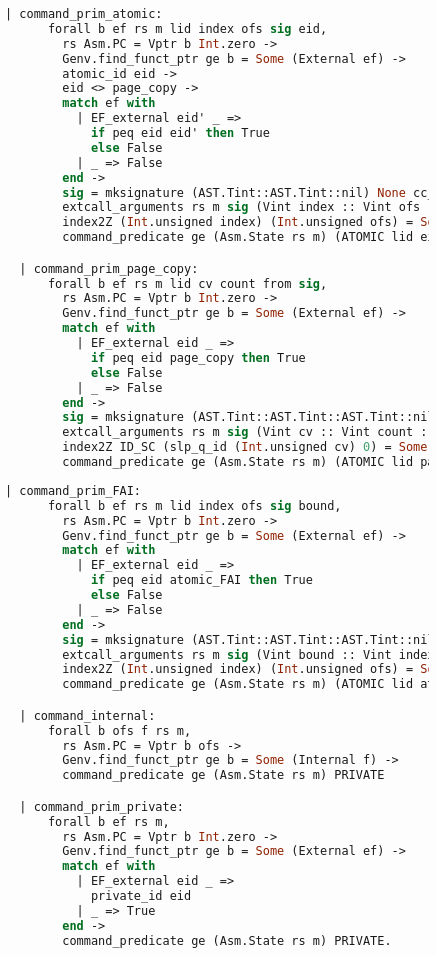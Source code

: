 \begin{figure}
\begin{lstlisting}[language=Caml]
  | command_prim_atomic:
      forall b ef rs m lid index ofs sig eid,
        rs Asm.PC = Vptr b Int.zero ->
        Genv.find_funct_ptr ge b = Some (External ef) ->
        atomic_id eid ->
        eid <> page_copy ->
        match ef with
          | EF_external eid' _ =>
            if peq eid eid' then True
            else False
          | _ => False
        end ->
        sig = mksignature (AST.Tint::AST.Tint::nil) None cc_default ->
        extcall_arguments rs m sig (Vint index :: Vint ofs :: nil) ->
        index2Z (Int.unsigned index) (Int.unsigned ofs) = Some lid ->
        command_predicate ge (Asm.State rs m) (ATOMIC lid eid)

  | command_prim_page_copy:
      forall b ef rs m lid cv count from sig,
        rs Asm.PC = Vptr b Int.zero ->
        Genv.find_funct_ptr ge b = Some (External ef) ->
        match ef with
          | EF_external eid _ => 
            if peq eid page_copy then True
            else False
          | _ => False
        end ->
        sig = mksignature (AST.Tint::AST.Tint::AST.Tint::nil) None cc_default ->
        extcall_arguments rs m sig (Vint cv :: Vint count :: Vint from :: nil) ->
        index2Z ID_SC (slp_q_id (Int.unsigned cv) 0) = Some lid ->
        command_predicate ge (Asm.State rs m) (ATOMIC lid page_copy)
\end{lstlisting}
\end{figure}

\begin{figure}

\begin{lstlisting}[language=Caml]
  | command_prim_FAI:
      forall b ef rs m lid index ofs sig bound,
        rs Asm.PC = Vptr b Int.zero ->
        Genv.find_funct_ptr ge b = Some (External ef) ->
        match ef with
          | EF_external eid _ => 
            if peq eid atomic_FAI then True
            else False
          | _ => False
        end ->
        sig = mksignature (AST.Tint::AST.Tint::AST.Tint::nil) None cc_default ->
        extcall_arguments rs m sig (Vint bound :: Vint index :: Vint ofs :: nil) ->
        index2Z (Int.unsigned index) (Int.unsigned ofs) = Some lid ->
        command_predicate ge (Asm.State rs m) (ATOMIC lid atomic_FAI)

  | command_internal:
      forall b ofs f rs m,
        rs Asm.PC = Vptr b ofs ->
        Genv.find_funct_ptr ge b = Some (Internal f) ->
        command_predicate ge (Asm.State rs m) PRIVATE

  | command_prim_private:
      forall b ef rs m,
        rs Asm.PC = Vptr b Int.zero ->
        Genv.find_funct_ptr ge b = Some (External ef) ->
        match ef with
          | EF_external eid _ => 
            private_id eid
          | _ => True
        end ->
        command_predicate ge (Asm.State rs m) PRIVATE.
\end{lstlisting}
\end{figure}


